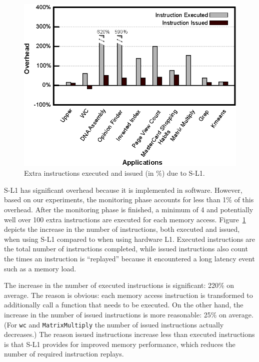 \begin{figure}[t]
\center
\includegraphics[scale=0.93]{4instructionIssueOverhead.eps}
\vspace{-0.4cm}
\caption{\footnotesize\textnormal{Extra instructions executed and issued (in \%) due to S-L1.}}
\label{fig:instexecissuedoverhead}
\end{figure}

S-L1 has significant overhead because it is implemented in software. 
However, based on our experiments, the monitoring phase accounts for less than 1\% of this overhead.
After the monitoring phase is finished, a minimum of 4 and potentially well over 100 extra
instructions are executed for each memory access.
Figure~\ref{fig:instexecissuedoverhead} depicts the increase in the number of instructions, both executed and issued,
when using S-L1 compared to when using hardware L1.
Executed instructions are the total number of instructions completed, while 
issued instructions also count the times an instruction is ``replayed'' because it
encountered a long latency event such as a memory load.

The increase in the number of executed instructions is significant: 220\% on average. 
The reason is obvious: each memory access instruction is transformed to additionally call a function that needs to be executed. 
On the other hand, the increase in the number of issued instructions is more reasonable: 25\% on average. 
(For \texttt{wc} and \texttt{MatrixMultiply} the number of issued instructions actually decreases.)
The reason issued instructions increase less than executed instructions is that S-L1 provides for improved memory performance, which reduces the number of required 
instruction replays.


